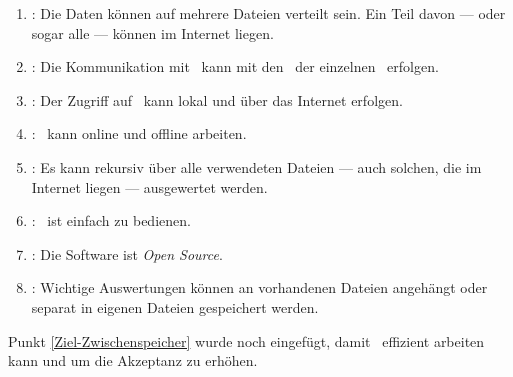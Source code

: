 \begin{enumerate}
	\item \label{Ziel-Internet} :
	Die Daten können auf mehrere Dateien verteilt sein.
	Ein Teil davon --- oder sogar alle --- können im Internet liegen.
	\item \label{Ziel-Kommunikation} :
	Die Kommunikation mit \ASBA\ kann mit den \Fachbegriffen\ der einzelnen \Fachgebiete\ erfolgen.
	\item \label{Ziel-Zugriff} :
	Der Zugriff auf \ASBA\ kann lokal und über das Internet erfolgen.
	\item \label{Ziel-Unabhaengigkeit} :
	\ASBA\ kann online und offline arbeiten.
	\item \label{Ziel-Rekursion} :
	Es kann rekursiv über alle verwendeten Dateien --- auch solchen, die im Internet liegen --- ausgewertet werden.
	\item \label{Ziel-Bedienbarkeit} :
	\ASBA\ ist einfach zu bedienen.
	\item \label{Ziel-Lizenz} :
	Die Software ist \emph{Open Source}.
	\item \label{Ziel-Zwischenspeicher} :
	Wichtige Auswertungen können an vorhandenen Dateien angehängt oder separat in eigenen Dateien gespeichert werden.
\end{enumerate}
%
Punkt \ref{Ziel-Zwischenspeicher} wurde noch eingefügt, damit \ASBA\ effizient arbeiten kann und um die Akzeptanz zu erhöhen.

